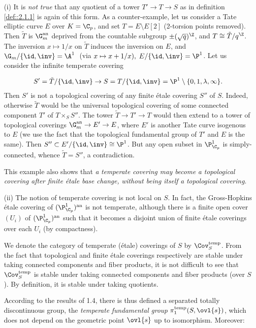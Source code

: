 \begin{rems}
 (i) It is {\it not true} that any quotient of a tower $T'\to T\to S$
 as in definition \ref{def::2.1.1} is again of this form. As a
 counter-example, let us consider a Tate elliptic curve $E$ over
 $K=\C_p$, and set $T= E\setminus E[2]$ (2-torsion points
 removed). Then $\tilde T $ is $\G_m^{\mathrm{an}}$ deprived from
 the countable subgroup $\pm (\sqrt q)^\Z$, and $T\cong \tilde
 T/q^\Z $. The inversion $x\mapsto 1/x$ on $\tilde T$ induces the
 inversion on $E$, and $\G_m/\{\id, \inv\}=\A^1 \;$ (via $x\mapsto
 x+1/x),\;E/\{\id,\inv\}=\P^1$. Let us consider the infinite
 temperate covering 

 \begin{equation*}
  S'=\tilde{T}/\{\id, \inv\} \to S= T/\{\id, \inv\}
   =\P^1\setminus\{0,1,\lambda,\infty\}.
 \end{equation*}
 Then $S'$ is not a topological covering of any finite \'etale
 covering $S''$ of $S$. Indeed, otherwise $\tilde T$ would be the
 universal topological covering of some connected component $T'$
 of $T\times_S S''$. The tower $\tilde T\to T' \to T$ would then
 extend to a tower of topological coverings $\G_m^{\mathrm{an}}\to
 E'\to E$, where $E'$ is another Tate curve isogenous to $E$ (we
 use the fact that the topological fundamental group of $T'$ and
 $E$ is the same). Then $S''\subset E'/\{\id, \inv\}\cong
 \P^1$. But any open subset in $\P^1_{\C_p}$ is simply-connected,
 whence $\tilde T= S''$, a contradiction.
 
 \noindent This example also shows that {\it a temperate covering may
 become a topological covering after finite \'etale base change, without
 being itself a topological covering}.

 (ii) The notion of temperate covering is not local on $S$. In fact,
 the Gross-Hopkins \'etale covering of
 $(\P^1_{\C_p})^{\mathrm{an}}$ is not temperate, although there is
 a finite open cover $(U_i)$ of $(\P^1_{\C_p})^{\mathrm{an}}$ such
 that it becomes a disjoint union of finite \'etale coverings over
 each $U_i$ (by compactness).
\end{rems}

\begin{para}\label{para::2.1.3} We denote the category of temperate
 (\'etale) coverings of $S$ by $\Cov^{\mathrm{temp}}_S$. 
 From the fact that topological and finite \'etale coverings
 respectively are stable under taking connected components and fiber
 products, it is not difficult to see that $\Cov^{\mathrm{temp}}_S$ is
 stable under taking connected components and fiber products (over
 $S$). By definition, it is stable under taking quotients. 
 
\medskip According to the results of 1.4, there is thus defined a
 separated totally discontinuous group, the {\it temperate fundamental group}
 $\pi_1^{\mathrm{temp}}(S,\ovl{s})$, which does not depend on the
 geometric point $\ovl{s}$ up to isomorphism. Moreover:
\end{para}

